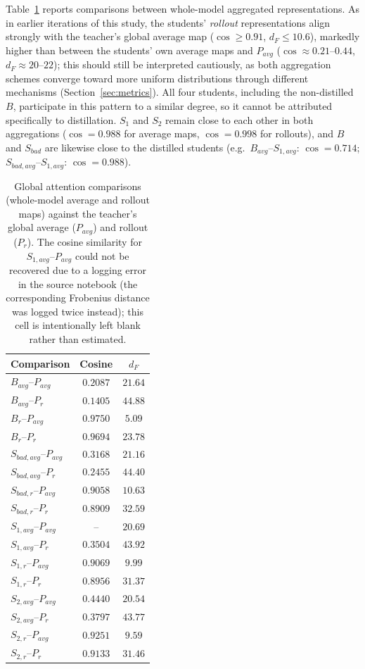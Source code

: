 \documentclass[conference]{IEEEtran}
\begin{document}
Table~\ref{tab:imdb_global} reports comparisons between whole-model aggregated representations. As in earlier iterations of this study, the students' \textit{rollout} representations align strongly with the teacher's global average map ($\cos\ge0.91$, $d_F\le10.6$), markedly higher than between the students' own average maps and $P_{avg}$ ($\cos\approx0.21$--$0.44$, $d_F\approx20$--$22$); this should still be interpreted cautiously, as both aggregation schemes converge toward more uniform distributions through different mechanisms (Section~\ref{sec:metrics}). All four students, including the non-distilled $B$, participate in this pattern to a similar degree, so it cannot be attributed specifically to distillation. $S_1$ and $S_2$ remain close to each other in both aggregations ($\cos=0.988$ for average maps, $\cos=0.998$ for rollouts), and $B$ and $S_{bad}$ are likewise close to the distilled students (e.g.\ $B_{avg}$--$S_{1,avg}$: $\cos=0.714$; $S_{bad,avg}$--$S_{1,avg}$: $\cos=0.988$).

\begin{table}[h!]
\centering
\caption{Global attention comparisons (whole-model average and rollout maps) against the teacher's global average ($P_{avg}$) and rollout ($P_r$). The cosine similarity for $S_{1,avg}$--$P_{avg}$ could not be recovered due to a logging error in the source notebook (the corresponding Frobenius distance was logged twice instead); this cell is intentionally left blank rather than estimated.}
\small
\begin{tabular}{|l|c|c|}
        \hline
        Comparison & Cosine & $d_F$ \\
        \hline
        $B_{avg}$--$P_{avg}$ & $0.2087$ & $21.64$ \\
        $B_{avg}$--$P_r$ & $0.1405$ & $44.88$ \\
        $B_{r}$--$P_{avg}$ & $0.9750$ & $5.09$ \\
        $B_{r}$--$P_r$ & $0.9694$ & $23.78$ \\
        $S_{bad,avg}$--$P_{avg}$ & $0.3168$ & $21.16$ \\
        $S_{bad,avg}$--$P_r$ & $0.2455$ & $44.40$ \\
        $S_{bad,r}$--$P_{avg}$ & $0.9058$ & $10.63$ \\
        $S_{bad,r}$--$P_r$ & $0.8909$ & $32.59$ \\
        $S_{1,avg}$--$P_{avg}$ & -- & $20.69$ \\
        $S_{1,avg}$--$P_r$ & $0.3504$ & $43.92$ \\
        $S_{1,r}$--$P_{avg}$ & $0.9069$ & $9.99$ \\
        $S_{1,r}$--$P_r$ & $0.8956$ & $31.37$ \\
        $S_{2,avg}$--$P_{avg}$ & $0.4440$ & $20.54$ \\
        $S_{2,avg}$--$P_r$ & $0.3797$ & $43.77$ \\
        $S_{2,r}$--$P_{avg}$ & $0.9251$ & $9.59$ \\
        $S_{2,r}$--$P_r$ & $0.9133$ & $31.46$ \\
        \hline
    \end{tabular}
\label{tab:imdb_global}
\end{table}
\end{document}
